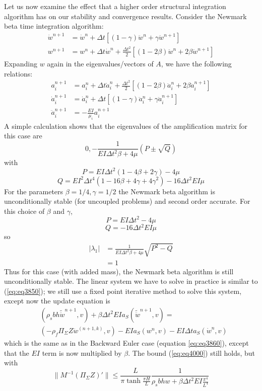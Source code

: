 \documentclass{article}
\begin{document}
Let us now examine the effect that a higher order structural integration algorithm has on our stability and convergence results.
Consider the Newmark beta time integration algorithm:
\begin{align*}
\dot{w}^{n+1} &= \dot{w}^n+\Delta t\left[(1-\gamma)\ddot{w}^{n}+\gamma \ddot{w}^{n+1}\right] \\
w^{n+1} &= w^n+\Delta t\dot{w}^{n} + \frac{\Delta t^2}{2}\left[ (1-2\beta)\ddot{w}^{n}+2\beta\ddot{w}^{n+1}\right] 
\end{align*}
Expanding $w$ again in the eigenvalues/vectors of $A$, we have the following relations:
\begin{align*}
a_i^{n+1} &= a_i^n+\Delta t\dot{a}_i^{n} + \frac{\Delta t^2}{2}\left[ (1-2\beta)\ddot{a}_i^{n}+2\beta\ddot{a}_i^{n+1}\right] \\
\dot{a}_i^{n+1} &= \dot{a}_i^n+\Delta t\left[(1-\gamma)\ddot{a}_i^{n}+\gamma \ddot{a}_i^{n+1}\right] \\
\ddot{a}_i^{n+1} &= -\frac{ EI}{\mu_i} a_i^{n+1}
\end{align*}
A simple calculation shows that the eigenvalues of the amplification matrix for this case are
\[ 0, -\frac{1}{EI\Delta t^2\beta+4\mu}( P \pm \sqrt{Q}) \]
with
\[P = EI\Delta t^2(1-4\beta+2\gamma)-4\mu\]
\[Q = EI^2 \Delta t^4(1-16\beta+4\gamma+4\gamma^2)-16\Delta t^2 EI \mu \]
For the parameters $\beta = 1/4, \gamma = 1/2$ the Newmark beta algorithm is unconditionally stable (for uncoupled problems) and second order accurate.  
For this choice of $\beta$ and $\gamma$,
\[ P = EI\Delta t^2-4\mu \]
\[ Q = -16\Delta t^2 EI \mu \]
so 
\begin{align*}
|\lambda_1| &= \frac{1}{EI\Delta t^2\beta+4\mu}\sqrt{P^2-Q} \\
            &= 1
\end{align*}
Thus for this case (with added mass), the Newmark beta algorithm is still unconditionally stable.
The linear system we have to solve in practice is similar to (\ref{eq:eq3850}); we still use a fixed point iterative method to solve this system, except now the update equation is
\begin{equation} \begin{aligned}
&(\rho_sbh\tilde{\ddot{w}}^{n+1}, v) + \beta \Delta t^2 EI a_S(\tilde{\ddot{w}}^{n+1},v)= \\
&(-\rho_f \Pi_{\Sigma}Z\ddot{w}^{(n+1,k)},v)- EI a_S(w^n,v)-EI\Delta t a_S(\dot{w}^n,v)
\end{aligned} \label{eq:eq4600} \end{equation}
which is the same as in the Backward Euler case (equation \ref{eq:eq3860}), except that the $EI$ term is now multiplied by $\beta$.  
The bound (\ref{eq:eq4000}) still holds, but with 
\begin{equation} \| M^{-1}\left(\Pi_{\Sigma}Z\right)' \| \leq \frac{L}{\pi \tanh{\frac{\pi H}{L}}}\frac{1}{\rho_s b h w + \beta \Delta t^2 EI\frac{\pi^4}{L^4}} \label{eq:eq4700} \end{equation}
\end{document}
